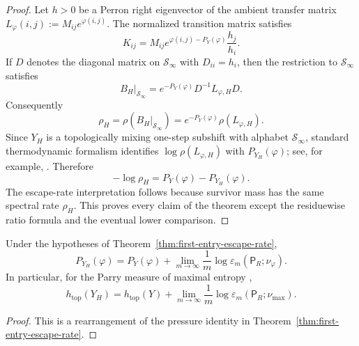 \begin{proof}
Let \(h>0\) be a Perron right eigenvector of the ambient transfer matrix
\(L_\varphi(i,j):=M_{ij}e^{\varphi(i,j)}\).  The normalized transition
matrix satisfies
\[
  K_{ij}
  = M_{ij}e^{\varphi(i,j)-P_Y(\varphi)}\frac{h_j}{h_i}.
\]
If \(D\) denotes the diagonal matrix on \(\mathcal S_\infty\) with
\(D_{ii}=h_i\), then the restriction to \(\mathcal S_\infty\) satisfies
\[
  B_H|_{\mathcal S_\infty}=e^{-P_Y(\varphi)}D^{-1}L_{\varphi,H}D.
\]
Consequently
\[
  \rho_H
  = \rho(B_H|_{\mathcal S_\infty})
  = e^{-P_Y(\varphi)}\rho(L_{\varphi,H}).
\]
Since \(Y_H\) is a topologically mixing one-step subshift with alphabet
\(\mathcal S_\infty\), standard thermodynamic formalism identifies
\(\log\rho(L_{\varphi,H})\) with \(P_{Y_H}(\varphi)\); see, for example,
\citet{Bowen2008,Ruelle1978}.  Therefore
\[
  -\log\rho_H
  = P_Y(\varphi)-P_{Y_H}(\varphi).
\]
The escape-rate interpretation follows because survivor mass has the
same spectral rate \(\rho_H\).  This proves every claim of the theorem
except the residuewise ratio formula and the eventual lower comparison.
\end{proof}

\begin{corollary}
\label{cor:survivor-pressure-recovery}
Under the hypotheses of
Theorem~\ref{thm:first-entry-escape-rate},
\[
  P_{Y_H}(\varphi)
  = P_Y(\varphi)
    + \lim_{m\to\infty}\frac1m
      \log \varepsilon_m(\mathsf{P}_R;\nu_\varphi).
\]
In particular, for the Parry measure of maximal entropy
\citet{Parry1964},
\[
  h_{\mathrm{top}}(Y_H)
  = h_{\mathrm{top}}(Y)
    + \lim_{m\to\infty}\frac1m
      \log \varepsilon_m(\mathsf{P}_R;\nu_{\max}).
\]
\end{corollary}

\begin{proof}
This is a rearrangement of the pressure identity in
Theorem~\ref{thm:first-entry-escape-rate}.
\end{proof}
